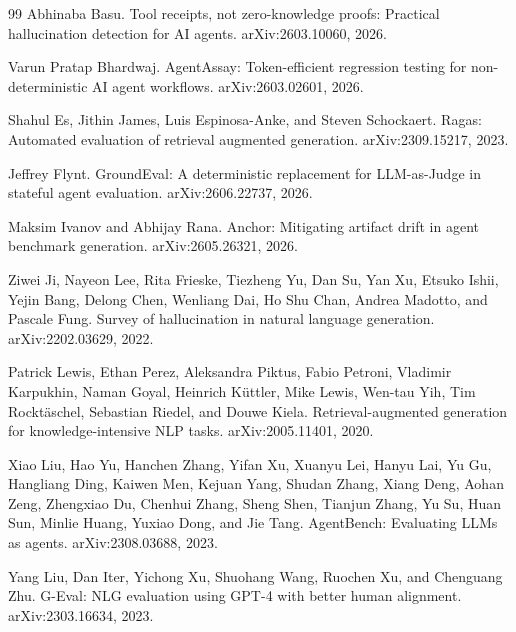 \begin{thebibliography}{99}
 Abhinaba Basu.
\newblock Tool receipts, not zero-knowledge proofs: Practical hallucination
detection for AI agents.
\newblock arXiv:2603.10060, 2026.

 Varun Pratap Bhardwaj.
\newblock AgentAssay: Token-efficient regression testing for
non-deterministic AI agent workflows.
\newblock arXiv:2603.02601, 2026.

 Shahul Es, Jithin James,
Luis Espinosa-Anke, and Steven Schockaert.
\newblock Ragas: Automated evaluation of retrieval augmented generation.
\newblock arXiv:2309.15217, 2023.

 Jeffrey Flynt.
\newblock GroundEval: A deterministic replacement for LLM-as-Judge in
stateful agent evaluation.
\newblock arXiv:2606.22737, 2026.

 Maksim Ivanov and Abhijay Rana.
\newblock Anchor: Mitigating artifact drift in agent benchmark generation.
\newblock arXiv:2605.26321, 2026.

 Ziwei Ji, Nayeon Lee, Rita Frieske,
Tiezheng Yu, Dan Su, Yan Xu, Etsuko Ishii, Yejin Bang, Delong Chen,
Wenliang Dai, Ho Shu Chan, Andrea Madotto, and Pascale Fung.
\newblock Survey of hallucination in natural language generation.
\newblock arXiv:2202.03629, 2022.

 Patrick Lewis, Ethan Perez,
Aleksandra Piktus, Fabio Petroni, Vladimir Karpukhin, Naman Goyal,
Heinrich K{\"u}ttler, Mike Lewis, Wen-tau Yih, Tim Rockt{\"a}schel,
Sebastian Riedel, and Douwe Kiela.
\newblock Retrieval-augmented generation for knowledge-intensive NLP tasks.
\newblock arXiv:2005.11401, 2020.

 Xiao Liu, Hao Yu,
Hanchen Zhang, Yifan Xu, Xuanyu Lei, Hanyu Lai, Yu Gu, Hangliang Ding,
Kaiwen Men, Kejuan Yang, Shudan Zhang, Xiang Deng, Aohan Zeng,
Zhengxiao Du, Chenhui Zhang, Sheng Shen, Tianjun Zhang, Yu Su, Huan Sun,
Minlie Huang, Yuxiao Dong, and Jie Tang.
\newblock AgentBench: Evaluating LLMs as agents.
\newblock arXiv:2308.03688, 2023.

 Yang Liu, Dan Iter, Yichong Xu,
Shuohang Wang, Ruochen Xu, and Chenguang Zhu.
\newblock G-Eval: NLG evaluation using GPT-4 with better human alignment.
\newblock arXiv:2303.16634, 2023.


\end{thebibliography}
